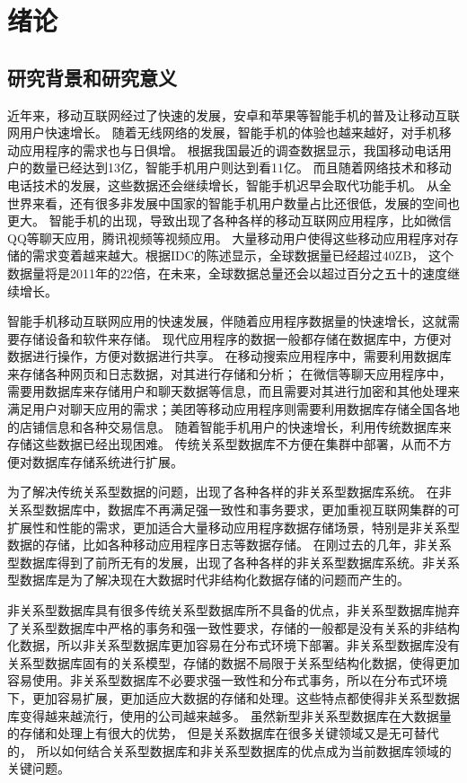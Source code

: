 
\chapter{绪论}
\section{研究背景和研究意义}
近年来，移动互联网经过了快速的发展，安卓和苹果等智能手机的普及让移动互联网用户快速增长。
随着无线网络的发展，智能手机的体验也越来越好，对手机移动应用程序的需求也与日俱增。
根据我国最近的调查数据显示，我国移动电话用户的数量已经达到13亿，智能手机用户则达到看11亿。
而且随着网络技术和移动电话技术的发展，这些数据还会继续增长，智能手机迟早会取代功能手机。
从全世界来看，还有很多非发展中国家的智能手机用户数量占比还很低，发展的空间也更大。
智能手机的出现，导致出现了各种各样的移动互联网应用程序，比如微信QQ等聊天应用，腾讯视频等视频应用。
大量移动用户使得这些移动应用程序对存储的需求变着越来越大。根据IDC的陈述显示，全球数据量已经超过40ZB，
这个数据量将是2011年的22倍，在未来，全球数据总量还会以超过百分之五十的速度继续增长。

智能手机移动互联网应用的快速发展，伴随着应用程序数据量的快速增长，这就需要存储设备和软件来存储。
现代应用程序的数据一般都存储在数据库中，方便对数据进行操作，方便对数据进行共享。
在移动搜索应用程序中，需要利用数据库来存储各种网页和日志数据，对其进行存储和分析；
在微信等聊天应用程序中，需要用数据库来存储用户和聊天数据等信息，而且需要对其进行加密和其他处理来满足用户对聊天应用的需求；美团等移动应用程序则需要利用数据库存储全国各地的店铺信息和各种交易信息。
随着智能手机用户的快速增长，利用传统数据库来存储这些数据已经出现困难。
传统关系型数据库不方便在集群中部署，从而不方便对数据库存储系统进行扩展。

为了解决传统关系型数据的问题，出现了各种各样的非关系型数据库系统。
在非关系型数据库中，数据库不再满足强一致性和事务要求，更加重视互联网集群的可扩展性和性能的需求，更加适合大量移动应用程序数据存储场景，特别是非关系型数据的存储，比如各种移动应用程序日志等数据存储。
在刚过去的几年，非关系型数据库得到了前所无有的发展，出现了各种各样的非关系型数据库系统。非关系型数据库是为了解决现在大数据时代非结构化数据存储的问题而产生的。

非关系型数据库具有很多传统关系型数据库所不具备的优点，非关系型数据库抛弃了关系型数据库中严格的事务和强一致性要求，存储的一般都是没有关系的非结构化数据，所以非关系型数据库更加容易在分布式环境下部署。非关系型数据库没有关系型数据库固有的关系模型，存储的数据不局限于关系型结构化数据，使得更加容易使用。非关系型数据库不必要求强一致性和分布式事务，所以在分布式环境下，更加容易扩展，更加适应大数据的存储和处理。这些特点都使得非关系型数据库变得越来越流行，使用的公司越来越多。
虽然新型非关系型数据库在大数据量的存储和处理上有很大的优势，
但是关系数据库在很多关键领域又是无可替代的，
所以如何结合关系型数据库和非关系型数据库的优点成为当前数据库领域的关键问题。

